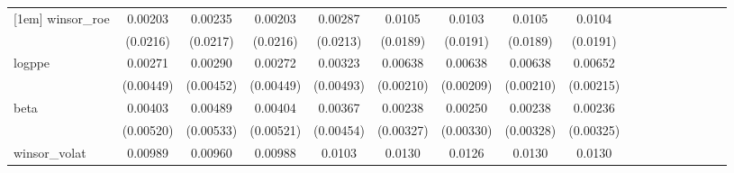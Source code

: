 \begin{table}[htbp]
\begin{tabular}{l*{16}{c}}
[1em]
winsor\_roe          &     0.00203         &     0.00235         &     0.00203         &     0.00287         &      0.0105         &      0.0103         &      0.0105         &      0.0104         &                     &                     &                     &                     &                     &                     &                     &                     \\
                    &    (0.0216)         &    (0.0217)         &    (0.0216)         &    (0.0213)         &    (0.0189)         &    (0.0191)         &    (0.0189)         &    (0.0191)         &                     &                     &                     &                     &                     &                     &                     &                     \\
[1em]
logppe              &     0.00271         &     0.00290         &     0.00272         &     0.00323         &     0.00638\sym{***}&     0.00638\sym{***}&     0.00638\sym{***}&     0.00652\sym{***}&                     &                     &                     &                     &                     &                     &                     &                     \\
                    &   (0.00449)         &   (0.00452)         &   (0.00449)         &   (0.00493)         &   (0.00210)         &   (0.00209)         &   (0.00210)         &   (0.00215)         &                     &                     &                     &                     &                     &                     &                     &                     \\
[1em]
beta                &     0.00403         &     0.00489         &     0.00404         &     0.00367         &     0.00238         &     0.00250         &     0.00238         &     0.00236         &                     &                     &                     &                     &                     &                     &                     &                     \\
                    &   (0.00520)         &   (0.00533)         &   (0.00521)         &   (0.00454)         &   (0.00327)         &   (0.00330)         &   (0.00328)         &   (0.00325)         &                     &                     &                     &                     &                     &                     &                     &                     \\
[1em]
winsor\_volat        &     0.00989         &     0.00960         &     0.00988         &      0.0103         &      0.0130         &      0.0126         &      0.0130         &      0.0130         &                     &                     &                     &                     &                     &                     &                     &                     \\

\end{tabular}
\end{table}
